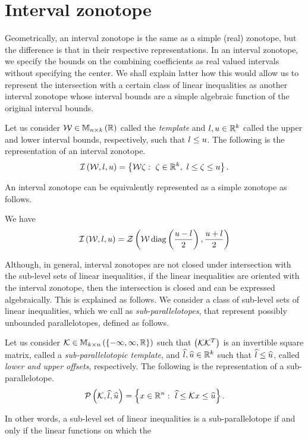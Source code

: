 \section{Interval zonotope}
Geometrically, an interval zonotope is the same as a simple (real)
zonotope, but the difference is that in their respective
representations.  In an interval zonotope, we specify the bounds on
the combining coefficients as real valued intervals without specifying
the center.  We shall explain latter how this would allow us to
represent the intersection with a certain class of linear inequalities
as another interval zonotope whose interval bounds are a simple
algebraic function of the original interval bounds.
%
\begin{definition}
Let us consider $\mathcal{W}\in\mathbb{M}_{n\times k}\left(\mathbb{R}\right)$ called the {\it
  template} and $l,u\in\mathbb{R}^k$ called the upper and lower
interval bounds, respectively, such that $l\leq u$.  The following
is the representation of an interval zonotope.
%
\[
\mathit{\operatorname{\mathcal{I}}}\left(\mathcal{W},l,u\right)=\left\{\mathcal{W}\zeta:~\zeta\in\mathbb{R}^k,~l\leq\zeta\leq u\right\}.
\]
%
\end{definition}
%
An interval zonotope can be equivalently represented as a simple
zonotope as follows.
%
\begin{proposition}
We have
%
\[
\mathit{\operatorname{\mathcal{I}}}\left(\mathcal{W},l,u\right)=\mathit{\mathcal{Z}}\left(\mathcal{W}\operatorname{diag}\left(\frac{u-l}{2}\right),\frac{u+l}{2}\right)
\]
%
\end{proposition}
%
Although, in general, interval zonotopes are not closed under
intersection with the sub-level sets of linear inequalities, if the
linear inequalities are oriented with the interval zonotope, then the
intersection is closed and can be expressed algebraically.  This is
explained as follows.  We consider a class of sub-level sets of
linear inequalities, which we call as {\it sub-parallelotopes}, that
represent possibly unbounded parallelotopes, defined as follows.
%
\begin{definition}
Let us consider ${\mathcal{K}}\in\mathbb{M}_{k\times n}\left(\left\{-\infty,\infty,\mathbb{R}\right\}\right)$
such that $\left(\mathcal{K}\mathcal{K}^T\right)$ is an invertible square
matrix, called a {\it sub-parallelotopic template}, and
$\widehat{l},\widehat{u}\in\mathbb{R}^k$ such that $\widehat{l}\leq\widehat{u}$, called {\it lower and
  upper offsets}, respectively.  The following is the representation
of a sub-parallelotope.
%
\[
\mathcal{P}\left(\mathcal{K},\widehat{l},\widehat{u}\right)=\left\{x\in\mathbb{R}^n:~\widehat{l}\leq\mathcal{K} x\leq\widehat{u}\right\}.
\]
%
\end{definition}
%
In other words, a sub-level set of linear inequalities is a
sub-parallelotope if and only if the linear functions on which the
